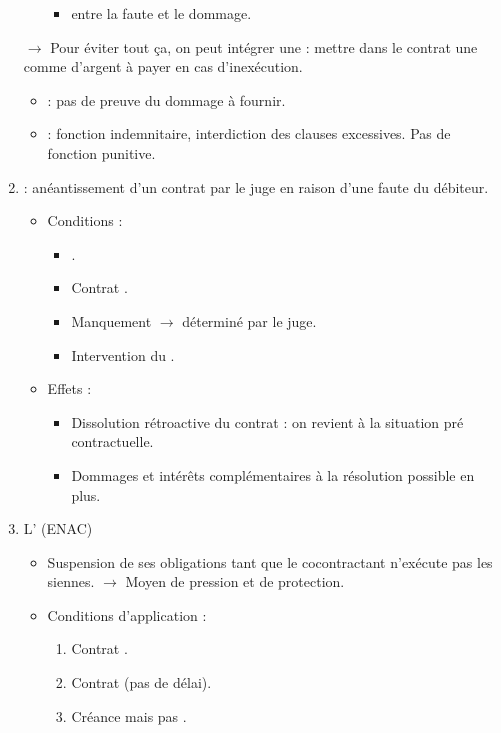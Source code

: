 \begin{enumerate}
\begin{itemize}
\begin{itemize}
			\item {} entre la faute et le dommage.
		\end{itemize}
	\end{itemize}
	$\rightarrow$ Pour éviter tout ça, on peut intégrer une  : mettre dans le contrat une comme d'argent à payer en cas d'inexécution.
	\begin{itemize}
		\item {} : pas de preuve du dommage à fournir.
		\item {} : fonction indemnitaire, interdiction des clauses excessives. Pas de fonction punitive.
	\end{itemize}
	\item {} : anéantissement d'un contrat par le juge en raison d'une faute du débiteur.
	\begin{itemize}
		\item Conditions :
		\begin{itemize}
			\item {}.
			\item Contrat .
			\item Manquement  $\rightarrow$ déterminé par le juge.
			\item Intervention du .
		\end{itemize}
		\item Effets :
		\begin{itemize}
			\item Dissolution rétroactive du contrat : on revient à la situation pré contractuelle.
			\item Dommages et intérêts complémentaires à la résolution possible en plus.
		\end{itemize}
	\end{itemize}
	\item L' (ENAC)
	\begin{itemize}
		\item Suspension de ses obligations tant que le cocontractant n'exécute pas les siennes. $\rightarrow$ Moyen de pression et de protection.
		\item Conditions d'application :
		\begin{enumerate}
			\item Contrat .
			\item Contrat  (pas de délai).
			\item Créance  mais pas .

\end{enumerate}
\end{itemize}
\end{enumerate}
